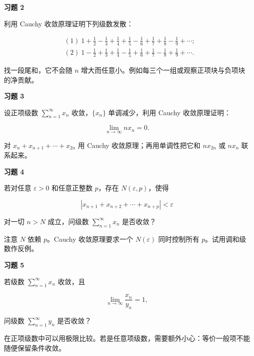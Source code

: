 \begin{exercisebox}
\textbf{习题 2 }

利用 Cauchy 收敛原理证明下列级数发散：

\[
      \begin{aligned}
      &(1)\ 1+\frac12-\frac13+\frac14+\frac15-\frac16+\frac17+\frac18-\frac19+\cdots;\\
      &(2)\ 1-\frac12+\frac13+\frac14-\frac15+\frac16+\frac17-\frac18+\frac19+\cdots.
      \end{aligned}
      \]

\begin{hintbox}
找一段尾和，它不会随 \(n\) 增大而任意小。例如每三个一组或观察正项块与负项块的净贡献。
\end{hintbox}
\end{exercisebox}

\begin{exercisebox}
\textbf{习题 3 }

设正项级数 \(\sum_{n=1}^{\infty}x_n\) 收敛，\(\{x_n\}\) 单调减少，利用 Cauchy 收敛原理证明：

\[
      \lim_{n\to\infty}nx_n=0.
      \]

\begin{hintbox}
对 \(x_n+x_{n+1}+\cdots+x_{2n}\) 用 Cauchy 收敛原理；再用单调性把它和 \(nx_{2n}\) 或 \(nx_n\) 联系起来。
\end{hintbox}
\end{exercisebox}

\begin{exercisebox}
\textbf{习题 4 }

若对任意 \(\varepsilon>0\) 和任意正整数 \(p\)，存在 \(N(\varepsilon,p)\)，使得

\[
      \left|x_{n+1}+x_{n+2}+\cdots+x_{n+p}\right|<\varepsilon
      \]

对一切 \(n>N\) 成立，问级数 \(\sum_{n=1}^{\infty}x_n\) 是否收敛？

\begin{hintbox}
注意 \(N\) 依赖 \(p\)。Cauchy 收敛原理要求一个 \(N(\varepsilon)\) 同时控制所有 \(p\)。试用调和级数作反例。
\end{hintbox}
\end{exercisebox}

\begin{exercisebox}
\textbf{习题 5 }

若级数 \(\sum_{n=1}^{\infty}x_n\) 收敛，且

\[
      \lim_{n\to\infty}\frac{x_n}{y_n}=1,
      \]

问级数 \(\sum_{n=1}^{\infty}y_n\) 是否收敛？

\begin{hintbox}
在正项级数中可以用极限比较。若是任意项级数，需要额外小心：等价一般项不能随便保留条件收敛。
\end{hintbox}
\end{exercisebox}

